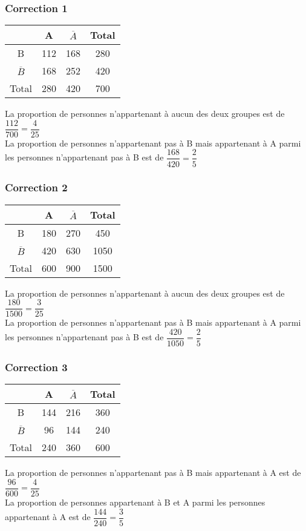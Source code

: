 \documentclass[15pt, mathserif]{beamer}
\begin{document}
\begin{frame}
\vspace{-10mm}
	\frametitle{Correction 1}
\begin{center} 
 \begin{tabular}{|c|c|c|c|} 
 \cline{2-4} 
 \multicolumn{1}{c|}{} & A & $\overline{A}$ & Total \\\hline 
 B   &112  &168& 280 \\\hline 
 $\overline{B}$   &168 & 252 & 420 \\\hline 
 Total   &280&420 &700 \\\hline  
 \end{tabular} 
 \end{center}
 La proportion de personnes n'appartenant à aucun des deux groupes est de $\dfrac{112}{700 }= \dfrac{4}{25}$
 \\ La proportion de personnes n'appartenant pas à B mais appartenant à A parmi les personnes n'appartenant pas à B est de $\dfrac{168}{420 }= \dfrac{2}{5}$
\end{frame}


\begin{frame}
\vspace{-10mm}
	\frametitle{Correction 2}
\begin{center} 
 \begin{tabular}{|c|c|c|c|} 
 \cline{2-4} 
 \multicolumn{1}{c|}{} & A & $\overline{A}$ & Total \\\hline 
 B   &180  &270& 450 \\\hline 
 $\overline{B}$   &420 & 630 & 1050 \\\hline 
 Total   &600&900 &1500 \\\hline  
 \end{tabular} 
 \end{center}
 La proportion de personnes n'appartenant à aucun des deux groupes est de $\dfrac{180}{1500 }= \dfrac{3}{25}$
 \\ La proportion de personnes n'appartenant pas à B mais appartenant à A parmi les personnes n'appartenant pas à B est de $\dfrac{420}{1050 }= \dfrac{2}{5}$
\end{frame}


\begin{frame}
\vspace{-10mm}
	\frametitle{Correction 3}
\begin{center} 
 \begin{tabular}{|c|c|c|c|} 
 \cline{2-4} 
 \multicolumn{1}{c|}{} & A & $\overline{A}$ & Total \\\hline 
 B   &144  &216& 360 \\\hline 
 $\overline{B}$   &96 & 144 & 240 \\\hline 
 Total   &240&360 &600 \\\hline  
 \end{tabular} 
 \end{center}
 La proportion de personnes n'appartenant pas à B mais appartenant à A est de $\dfrac{96}{600 }= \dfrac{4}{25}$
 \\ La proportion de personnes appartenant à B et A parmi les personnes appartenant à A est de $\dfrac{144}{240 }= \dfrac{3}{5}$
\end{frame}
\end{document}
